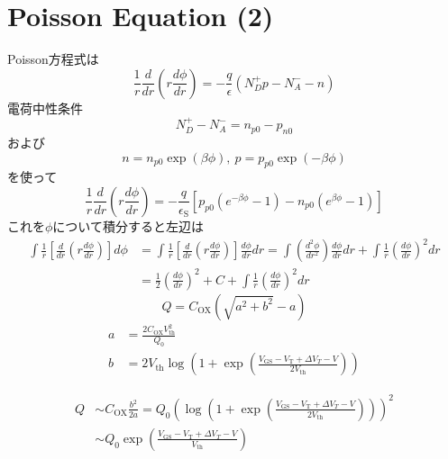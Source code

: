 \documentclass[11pt,uplatex]{jsarticle}
\def\d#1#2{\frac{d #1}{d #2}}
\def\dd#1#2{\frac{d^2 #1}{d #2^2}}
\begin{document}
\section{Poisson Equation (2)}
Poisson方程式は
\begin{equation}
 \frac{1}{r}\d{}{r}(r\d{\phi}{r}) =  -\frac{q}{\epsilon}
  (N_D^ + p - N_A^- - n)
\end{equation}
電荷中性条件
\begin{equation}
 N_D^+ - N_A^- = n_{p0}-p_{n0}
\end{equation}
および
\begin{equation}
 n=n_{p0} \exp(\beta \phi),\ p = p_{p0} \exp(-\beta\phi)
\end{equation}
を使って
\begin{equation}
 \frac{1}{r}\d{}{r}(r\d{\phi}{r})
  =-\frac{q}{\epsilon_{\mathrm{S}}}
[p_{p0}(e^{-\beta \phi} -1) - n_{p0} (e^{\beta \phi} -1)]
\end{equation}
これを$\phi$について積分すると左辺は
\begin{subequations}
\begin{align}
\int \frac{1}{r}[\d{}{r}(r \d{\phi}{r})]d\phi
  & =
  \int \frac{1}{r}[\d{}{r}(r \d{\phi}{r})]\d{\phi}{r} dr
  =\int (\dd{\phi}{r})\d{\phi}{r} d r +
  \int \frac{1}{r}(\d{\phi}{r})^2 dr \\
&= \frac{1}{2}(\d{\phi}{r})^2 + C + \int \frac{1}{r}(\d{\phi}{r})^2 dr 
\end{align}
\end{subequations}
\begin{equation}
 Q=C_{\mathrm{OX}}
  \left(
   \sqrt{a^2+b^2}-a
  \right)
\end{equation}
\begin{subequations}
\begin{align}
 a&=\frac{2 C_{\mathrm{OX}}V_{\mathrm{th}}^2}{Q_0} \\
 b&=2 V_{\mathrm{th}} \log
 \left(1+\exp
 \left(\frac{V_{\mathrm{GS}}-V_{\mathrm{T}}+\Delta V_{T}-V}{2 V_{\mathrm{th}}} 
 \right)
 \right)
\end{align}
\end{subequations}

\begin{subequations}
\begin{align}
 Q&\sim C_{\mathrm{OX}}\frac{b^2}{2a}
  =  Q_0 \left( \log \left(1+\exp \left(\frac{V_{\mathrm{GS}}-V_{\mathrm{T}}+\Delta V_{T}-V}{2 V_{\mathrm{th}}}  \right)
					\right)\right)^2 \\
 &\sim Q_0 \exp \left(\frac{V_{\mathrm{GS}}-V_{\mathrm{T}}+\Delta V_{T}-V}{V_{\mathrm{th}}}\right)
\end{align}
\end{subequations}
\end{document}
